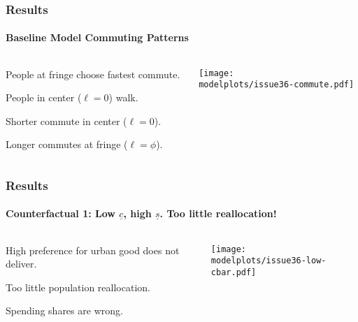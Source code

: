 \documentclass[aspectratio=169]{beamer}
\begin{document}
\begin{frame}
\frametitle{Results}
\framesubtitle{Baseline Model Commuting Patterns}

\begin{columns}
\begin{column}{0.3\textwidth}
\begin{mide}
\item People at fringe choose fastest commute.
\item People in center ($\ell=0$) walk.
\item Shorter commute in center ($\ell=0$).
\item Longer commutes at fringe ($\ell=\phi$).
\end{mide}
\end{column}
\begin{column}{0.7\textwidth}
\begin{adjustbox}{center}
\texttt{[image: \\modelplots/issue36-commute.pdf]}\end{adjustbox}
\end{column}\end{columns}
\end{frame}

\begin{frame}
\frametitle{Results}
\framesubtitle{Counterfactual 1: Low $\underline{c}$, high $\underline{s}$. Too little reallocation!}

\begin{columns}
\begin{column}{0.3\textwidth}
\begin{midi}
\item High preference for urban good does not deliver.
\item Too little population reallocation.
\item Spending shares are wrong.
\end{midi}
\end{column}
\begin{column}{0.7\textwidth}
\begin{adjustbox}{center}
\texttt{[image: \\modelplots/issue36-low-cbar.pdf]}\end{adjustbox}
\end{column}\end{columns}
\end{frame}
\end{document}
